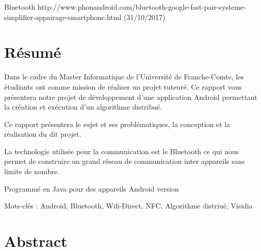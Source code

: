 \documentclass[a4paper,10pt]{report}
\begin{document}
 Bluetooth
 http://www.phonandroid.com/bluetooth-google-fast-pair-systeme-simplifier-appairage-smartphone.html (31/10/2017)
 \chapter*{Résumé}
 Dans le cadre du Master Informatique de l'Université de Franche-Comte, les étudiants ont comme mission de réaliser un projet tuteuré. Ce rapport vous présentera notre projet de développement d'une application Android permettant la création et exécution d'un algorithme distribué.
 
 Ce rapport présentera le sujet et ses problématiques, la conception et la réalisation du dit projet.
 
 La technologie utilisée pour la communication est le Bluetooth ce qui nous permet de construire un grand réseau de communication inter appareils sans limite de nombre.
 
 Programmé en Java  pour des appareils Android version 
 
 Mots-clés : Android, Bluetooth, Wifi-Direct, NFC, Algorithme distriué, Visidia 
 \chapter*{Abstract}
\end{document}
